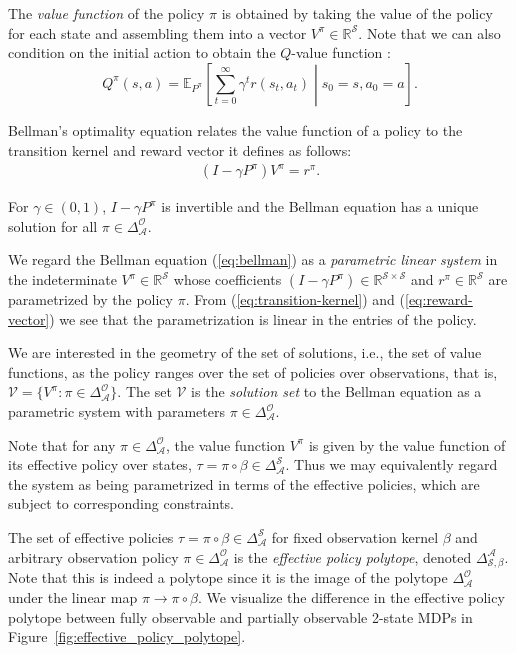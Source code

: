 \documentclass{article}
\theoremstyle{definition}
\theoremstyle{remark}
\newcommand{\sR}{\mathbb{R}}
\begin{document}
The \textit{value function} of the policy $\pi$ is obtained by taking the value of the policy for each state and assembling them into a vector $V^{\pi} \in \sR^{\mathcal S}$. Note that we can also condition on the initial action to obtain the 
$Q$-value function \cite{suttonReinforcementLearningIntroduction2018}:
\begin{equation*}
    Q^{\pi}(s,a) = \mathbb{E}_{P^{\pi}}\left [\sum_{t=0}^\infty \gamma^t r(s_t, a_t) \middle | s_0 =s, a_0 = a \right ]. 
\end{equation*}

Bellman's optimality equation \cite{bellmanMarkovianDecisionProcess1957} 
relates the value function of a policy 
to the transition kernel and reward vector it defines as follows: 
\begin{align}
    (I - \gamma P^\pi)V^\pi = r^\pi.
    \label{eq:bellman}
\end{align} 

For $\gamma\in(0,1)$,  $I-\gamma P^\pi$ is invertible and the Bellman equation has a unique solution for all $\pi \in \Delta^{\mathcal O}_{\mathcal A}$. 

We regard the Bellman equation (\ref{eq:bellman}) as a \emph{parametric linear system} in the indeterminate $V^\pi\in\mathbb{R}^{\mathcal S}$ whose  coefficients $(I - \gamma P^\pi)\in\mathbb{R}^{\mathcal S \times \mathcal S}$ and $r^\pi\in\mathbb{R}^{\mathcal S}$ are parametrized by the policy $\pi$. 
%
From (\ref{eq:transition-kernel}) and (\ref{eq:reward-vector}) we see that the parametrization is linear in the entries of the policy. 

We are interested in the geometry of the set of solutions, i.e., the set of value functions, as the policy ranges over the set of policies over observations, that is, $\mathcal{V} = \{V^{\pi} : \pi \in \Delta^{\mathcal O}_{\mathcal A} \}$. 
% 
The set $\mathcal{V}$ is the \emph{solution set} to the Bellman equation as a parametric system with parameters $\pi\in\Delta^{\mathcal O}_{\mathcal A}$. 

Note that for any $\pi \in \Delta^{\mathcal O}_{\mathcal A}$, the value function $V^\pi$ is given by the value function of its effective policy over states, $\tau = \pi \circ \beta\in\Delta^{\mathcal S}_{\mathcal A}$. 
%
Thus we may equivalently regard the system as being parametrized in terms of the effective policies, which are subject to corresponding constraints. 

The set of effective policies $\tau = \pi \circ \beta \in \Delta^{\mathcal S}_{\mathcal A}$ for fixed observation kernel $\beta$ and arbitrary observation policy $\pi\in\Delta^{\mathcal O}_{\mathcal A}$ is the \textit{effective policy polytope}, denoted $\Delta^{\mathcal A}_{\mathcal S,\beta}$. 
%
Note that this is indeed a polytope since it is the image of the polytope $\Delta^{\mathcal O}_{\mathcal A}$ under the linear map $\pi \to \pi \circ \beta$. 
%
We visualize the difference in the effective policy polytope between fully observable and partially observable 2-state MDPs in Figure~\ref{fig:effective_policy_polytope}. 
\end{document}

